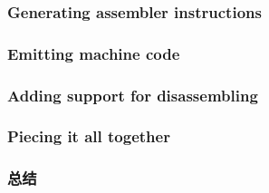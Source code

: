 \documentclass[11pt,a4paper,UTF8]{ctexart}
\begin{document}
		\subsubsection{Generating assembler instructions}
		\subsubsection{Emitting machine code}
		\subsubsection{Adding support for disassembling}
		\subsubsection{Piecing it all together}
		\subsubsection{总结}
\end{document}
